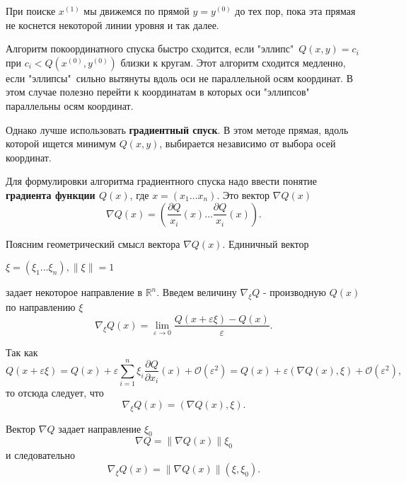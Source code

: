 При поиске $x^{(1)}$ мы движемся по прямой $y = y^{(0)}$ до тех пор, пока эта прямая не коснется некоторой линии уровня и так далее.

Алгоритм покоординатного спуска быстро сходится, если "эллипс"\, $Q(x, y) = c_i$ при $c_i < Q(x^{(0)}, y^{(0)})$ близки к кругам. Этот алгоритм сходится медленно, если "эллипсы"\, сильно вытянуты вдоль оси не параллельной осям координат. В этом случае полезно перейти к координатам в которых оси "эллипсов"\, параллельны осям координат.

Однако лучше использовать \textbf{градиентный спуск}. В этом методе прямая, вдоль которой ищется минимум $Q(x, y)$, выбирается независимо от выбора осей координат.

Для формулировки алгоритма градиентного спуска надо ввести понятие \textbf{градиента функции $Q(x)$}, где $x = (x_1 \dots x_n)$. Это вектор $\nabla Q(x)$
\begin{equation} \label{eq:8.1}
	\nabla Q(x) = (\frac{\partial Q}{x_i}(x) \dots \frac{\partial Q}{x_i}(x)).
\end{equation}

Поясним геометрический смысл вектора $\nabla Q(x)$. Единичный вектор \parbox{39mm}{$\xi = (\xi_1 \dots \xi_n), \|\xi\| = 1$} задает некоторое направление в $\mathbb{R}^n$. Введем величину $\nabla_\xi Q$ - производную $Q(x)$ по направлению $\xi$
\begin{equation} \label{eq:8.2}
	\nabla_\xi Q(x) = \lim_{\varepsilon \to 0} \frac{Q(x+\varepsilon\xi) - Q(x)}{\varepsilon}.
\end{equation}

Так как
\begin{equation} \label{eq:8.3}
	Q(x+\varepsilon\xi) = Q(x) + \varepsilon\sum^n_{i=1}{\xi_i \frac{\partial Q}{\partial x_i}(x) + \mathcal{O}(\varepsilon^2)} = Q(x) + \varepsilon(\nabla Q(x), \xi) + \mathcal{O}(\varepsilon^2),
\end{equation}
то отсюда следует, что
\begin{equation} \label{eq:8.4}
	\nabla_\xi Q(x) = (\nabla Q(x), \xi).
\end{equation}

Вектор $\nabla Q$ задает направление $\xi_0$
\begin{equation} \label{eq:8.5}
	\nabla Q = \|\nabla Q(x)\|\xi_0 
\end{equation}
и следовательно
\begin{equation} \label{eq:8.6}
	\nabla_\xi Q(x) = \|\nabla Q(x)\|(\xi, \xi_0).
\end{equation}


